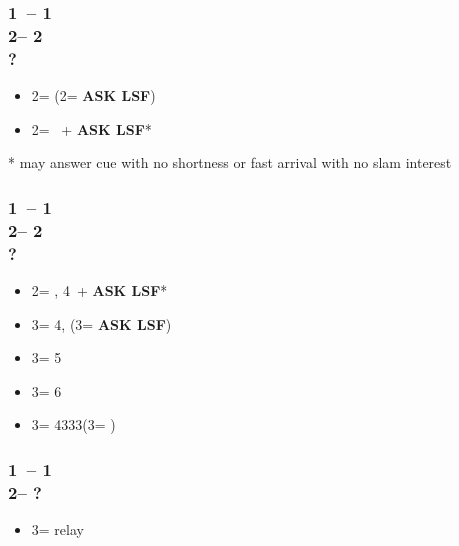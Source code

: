 \documentclass[12pt, a4paper]{report}
\renewcommand{\lsf}{{\color{BrickRed}\textbf{ASK LSF}}}
\begin{document}
\begin{bidpage}
\subsubsection*{1\clubs\ -- 1\major\\
                2\diams -- 2\hearts\\
                ?}
\begin{itemize}
    \item 2\spades = \unbal (2\nt = \lsf)
    \item 2\nt = \bal\ + \lsf*
\end{itemize}

* may answer cue with no shortness or fast arrival with no slam interest
\end{bidpage}

\begin{bidpage}
\subsubsection*{1\clubs\ -- 1\major\\
                2\diams -- 2\spades\\
                ?}
\begin{itemize}
    \item 2\nt = \bal, 4\hearts\ + \lsf*
    \item 3\clubs = 4\hearts, \unbal (3\diams = \lsf)
    \item 3\diams = 5\hearts
    \item 3\hearts = 6\hearts
    \item 3\spades = 4333\hearts (3\nt = \soff)
\end{itemize}
\end{bidpage}

\begin{bidpage}
\subsubsection*{1\clubs\ -- 1\hearts\\
                2\nt -- ?}
\begin{itemize}
    \item 3\clubs = relay
\end{itemize}
\end{bidpage}
\end{document}
